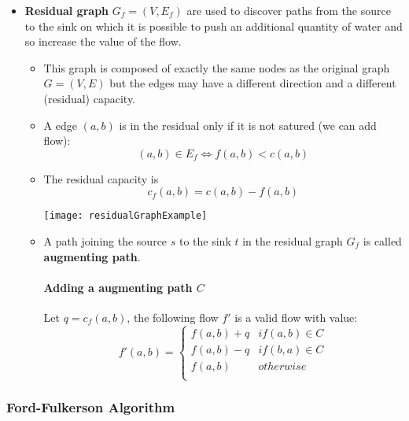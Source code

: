 \begin{itemize}
    \item \textbf{Residual graph} $G_f = (V, E_f)$ are used to discover paths from the
        source to the sink on which it is possible to push an
        additional quantity of water and so increase the value of the
        flow. 

        \begin{itemize}
            \item This graph is composed of exactly the same nodes as the
                original graph $G = (V, E)$ but the edges may have a different
                direction and a different (residual) capacity.

            \item A edge $(a, b)$ is in the residual only if it is not
                satured (we can add flow):
                $$(a, b) \in E_f \Leftrightarrow f(a, b) < c(a, b)$$

            \item The residual capacity is 
                $$c_f(a, b) = c(a, b) - f(a, b)$$

        \begin{center}
            \texttt{[image: residualGraphExample]}
            \end{center}

    \item A path joining the source $s$ to the sink $t$ in the residual
        graph $G_f$ is called \textbf{augmenting path}.

        \paragraph{Adding a augmenting path $C$}
            Let $q=c_f(a, b)$, the following
            flow $f'$ is a valid flow with value:
                $$f'(a, b) = \begin{cases}
                    f(a,b) + q & if (a, b) \in C\\
                    f(a,b) - q & if (b, a) \in C\\
                    f(a,b)  & otherwise\\
                \end{cases}$$
        \end{itemize}

\end{itemize}


\subsubsection{Ford-Fulkerson Algorithm}

